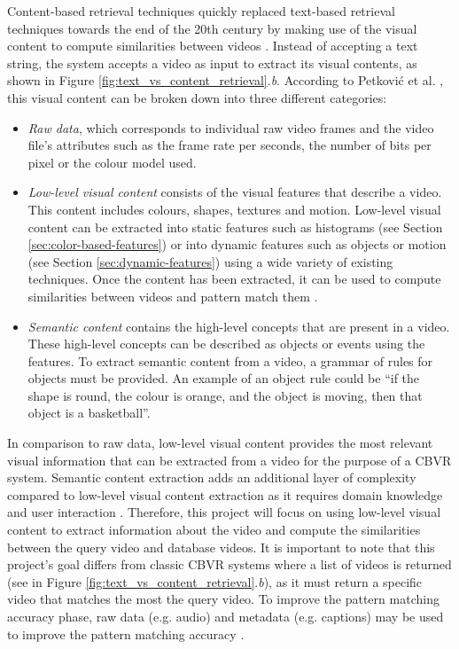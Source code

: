Content-based retrieval techniques quickly replaced text-based retrieval techniques towards the end of the 20th century by making use of the visual content to compute similarities between videos \cite{lai2015trajectory}. Instead of accepting a text string, the system accepts a video as input to extract its visual contents, as shown in Figure \ref{fig:text_vs_content_retrieval}.\emph{b}. According to Petković et al. \cite{petkovic2000}, this visual content can be broken down into three different categories:

\begin{itemize}
    
    \item \textit{Raw data}, which corresponds to individual raw video frames and the video file's attributes such as the frame rate per seconds, the number of bits per pixel or the colour model used.
    
    \item \textit{Low-level visual content} consists of the visual features that describe a video. This content includes colours, shapes, textures and motion. Low-level visual content can be extracted into static features such as histograms (see Section \ref{sec:color-based-features}) or into dynamic features such as objects or motion (see Section \ref{sec:dynamic-features}) using a wide variety of existing techniques. Once the content has been extracted, it can be used to compute similarities between videos and pattern match them \cite{lai2015trajectory}.
    
    \item \textit{Semantic content} contains the high-level concepts that are present in a video. These high-level concepts can be described as objects or events using the features. To extract semantic content from a video, a grammar of rules for objects must be provided. An example of an object rule could be ``if the shape is round, the colour is orange, and the object is moving, then that object is a basketball''.

\end{itemize}

In comparison to raw data, low-level visual content provides the most relevant visual information that can be extracted from a video for the purpose of a CBVR system. Semantic content extraction adds an additional layer of complexity compared to low-level visual content extraction as it requires domain knowledge and user interaction \cite{petkovic2000}. Therefore, this project will focus on using low-level visual content to extract information about the video and compute the similarities between the query video and database videos. It is important to note that this project's goal differs from classic CBVR systems where a list of videos is returned (see in Figure \ref{fig:text_vs_content_retrieval}.\emph{b}), as it must return a specific video that matches the most the query video. To improve the pattern matching accuracy phase, raw data (e.g. audio) and metadata (e.g. captions) may be used to improve the pattern matching accuracy \cite{patel2012}.\\

